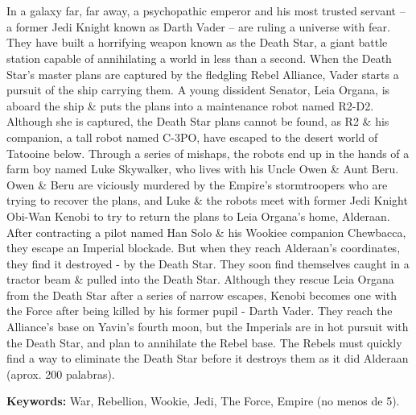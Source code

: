 \chapter*{\runtitle}

\noindent In a galaxy far, far away, a psychopathic emperor and his most trusted servant -- a former Jedi Knight known as Darth Vader -- are ruling a universe with fear. They have built a horrifying weapon known as the Death Star, a giant battle station capable of annihilating a world in less than a second. When the Death Star's master plans are captured by the fledgling Rebel Alliance, Vader starts a pursuit of the ship carrying them. A young dissident Senator, Leia Organa, is aboard the ship \& puts the plans into a maintenance robot named R2-D2. Although she is captured, the Death Star plans cannot be found, as R2 \& his companion, a tall robot named C-3PO, have escaped to the desert world of Tatooine below. Through a series of mishaps, the robots end up in the hands of a farm boy named Luke Skywalker, who lives with his Uncle Owen \& Aunt Beru. Owen \& Beru are viciously murdered by the Empire's stormtroopers who are trying to recover the plans, and Luke \& the robots meet with former Jedi Knight Obi-Wan Kenobi to try to return the plans to Leia Organa's home, Alderaan. After contracting a pilot named Han Solo \& his Wookiee companion Chewbacca, they escape an Imperial blockade. But when they reach Alderaan's coordinates, they find it destroyed - by the Death Star. They soon find themselves caught in a tractor beam \& pulled into the Death Star. Although they rescue Leia Organa from the Death Star after a series of narrow escapes, Kenobi becomes one with the Force after being killed by his former pupil - Darth Vader. They reach the Alliance's base on Yavin's fourth moon, but the Imperials are in hot pursuit with the Death Star, and plan to annihilate the Rebel base. The Rebels must quickly find a way to eliminate the Death Star before it destroys them as it did Alderaan (aprox. 200 palabras).

\bigskip

\noindent\textbf{Keywords:} War, Rebellion, Wookie, Jedi, The Force, Empire (no menos de 5).